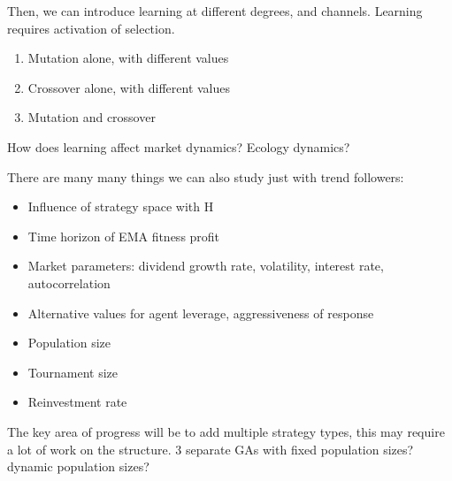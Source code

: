 \documentclass{article}
\begin{document}
Then, we can introduce learning at different degrees, and channels. Learning requires activation of selection.

\begin{enumerate}
    \item Mutation alone, with different values
    \item Crossover alone, with different values
    \item Mutation and crossover
\end{enumerate}

How does learning affect market dynamics? Ecology dynamics?

There are many many things we can also study just with trend followers:
\begin{itemize}
    \item Influence of strategy space with H
    \item Time horizon of EMA fitness profit
    \item Market parameters: dividend growth rate, volatility, interest rate, autocorrelation
    \item Alternative values for agent leverage, aggressiveness of response 
    \item Population size
    \item Tournament size
    \item Reinvestment rate
\end{itemize}

The key area of progress will be to add multiple strategy types, this may require a lot of work on the structure. 3 separate GAs with fixed population sizes? dynamic population sizes?

\printbibliography
\end{document}

